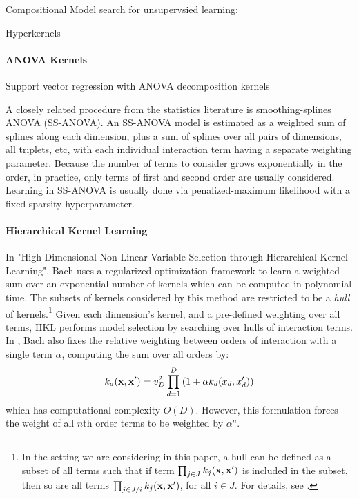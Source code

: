 \documentclass[twoside]{article}
\begin{document}
Compositional Model search for unsupervsied learning: \cite{grosse2012exploiting}

Hyperkernels \cite{ong2002hyperkernels}

\paragraph{ANOVA Kernels}

Support vector regression with ANOVA decomposition kernels \cite{stitson1999support}

A closely related procedure from the statistics literature is smoothing-splines ANOVA (SS-ANOVA)\cite{wahba1990spline, gu2002smoothing}. An SS-ANOVA model is estimated as a weighted sum of splines along each dimension, plus a sum of splines over all pairs of dimensions, all triplets, etc, with each individual interaction term having a separate weighting parameter.  Because the number of terms to consider grows exponentially in the order, in practice, only terms of first and second order are usually considered.  Learning in SS-ANOVA is usually done via penalized-maximum likelihood with a fixed sparsity hyperparameter.

\paragraph{Hierarchical Kernel Learning}

In "High-Dimensional Non-Linear Variable Selection through Hierarchical Kernel Learning", Bach\cite{DBLP:journals/corr/abs-0909-0844} uses a regularized optimization framework to learn a weighted sum over an exponential number of kernels which can be computed in polynomial time.  The subsets of kernels considered by this method are restricted to be a \textit{hull} of kernels.\footnote{In the setting we are considering in this paper, a hull can be defined as a subset of all terms such that if term $\prod_{j \in J} k_j(\bf x, x')$ is included in the subset, then so are all terms $\prod_{j \in J / i} k_j(\bf x, x')$, for all $i \in J$.  For details, see \cite{DBLP:journals/corr/abs-0909-0844}.}
Given each dimension's kernel, and a pre-defined weighting over all terms, HKL performs model selection by searching over hulls of interaction terms.
In \cite{DBLP:journals/corr/abs-0909-0844}, Bach also fixes the relative weighting between orders of interaction with a single term $\alpha$, computing the sum over all orders by:
\begin{equation}
\label{eqn:uniform}
k_{a}({\bf x, x'}) = v_D^2 \prod_{d=1}^D \left(1 + \alpha k_{d}(x_{d}, x_{d}') \right)
\end{equation}
which has computational complexity $O(D)$.  However, this formulation forces the weight of all $n$th order terms to be weighted by $\alpha^n$.
\end{document}
